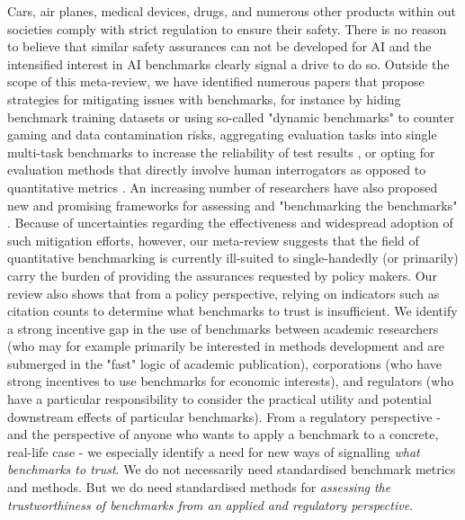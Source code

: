 Cars, air planes, medical devices, drugs, and numerous other products within out societies comply with strict regulation to ensure their safety. There is no reason to believe that similar safety assurances can not be developed for AI and the intensified interest in AI benchmarks clearly signal a drive to do so. Outside the scope of this meta-review, we have identified numerous papers that propose strategies for mitigating  issues with benchmarks, for instance by hiding benchmark training datasets \cite{chollet2019} or using so-called "dynamic benchmarks" \cite{besen2024} to counter gaming and data contamination risks, aggregating evaluation tasks into single multi-task benchmarks to increase the reliability of test results \cite{srivastava2023, liang2023}, or opting for evaluation methods that directly involve human interrogators as opposed to quantitative metrics \cite{chang2023}. An increasing number of researchers have also proposed new and promising frameworks for assessing and "benchmarking the benchmarks" \cite{miltenberger2023, reuel_betterbench_2024}. Because of uncertainties regarding the effectiveness \cite{zhang2024, arzt2024, rauh2024} and widespread adoption of such mitigation efforts, however, our meta-review suggests that the field of quantitative benchmarking is currently ill-suited to single-handedly (or primarily) carry the burden of providing the assurances requested by policy makers. Our review also shows that from a policy perspective, relying on indicators such as citation counts to determine what benchmarks to trust is insufficient. We identify a strong incentive gap in the use of benchmarks between academic researchers (who may for example primarily be interested in methods development and are submerged in the "fast" logic of academic publication), corporations (who have strong incentives to use benchmarks for economic interests), and regulators (who have a particular responsibility to consider the practical utility and potential downstream effects of particular benchmarks). From a regulatory perspective - and the perspective of anyone who wants to apply a benchmark to a concrete, real-life case - we especially identify a need for new ways of signalling \textit{what benchmarks to trust}. We do not necessarily need standardised benchmark metrics and methods. But we do need standardised methods for \textit{assessing the trustworthiness of benchmarks from an applied and regulatory perspective}. 



